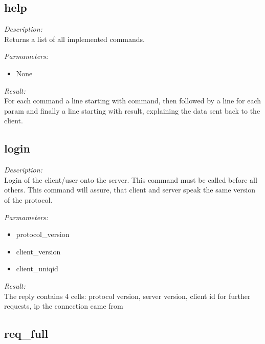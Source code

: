 \subsection{help}

\begin{description}
\item {\it Description:}\\
Returns a list of all implemented commands.
\item {\it Parmameters:}
\begin{itemize}
\item None
\end{itemize}
\item {\it Result:}\\
For each command a line starting with command, then followed by a line for each param and finally a line starting with result, explaining the data sent back to the client.
\end{description}

\subsection{login}

\begin{description}
\item {\it Description:}\\
Login of the client/user onto the server. This command must be called before all others. This command will assure, that client and server speak the same version of the protocol.
\item {\it Parmameters:}
\begin{itemize}
\item protocol\_version
\item client\_version
\item client\_uniqid
\end{itemize}
\item {\it Result:}\\
The reply contains 4 cells: protocol version, server version, client id for further requests, ip the connection came from
\end{description}

\subsection{req\_full}

